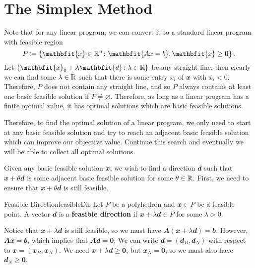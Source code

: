 \documentclass[math, code]{amznotes}
\theoremstyle{remark}
\begin{document}
\section{The Simplex Method}
Note that for any linear program, we can convert it to a standard linear program with feasible region
\begin{equation*}
    P \coloneqq \left\{\mathbfit{x} \in \R^n \colon \mathbfit{Ax = b}, \mathbfit{x} \geq \mathbf{0}\right\}.
\end{equation*}
Let $\left\{\mathbfit{x}_0 + \lambda\mathbfit{d} \colon \lambda \in \R\right\}$ be any straight line, then clearly we can find some $\lambda \in \mathbb{R}$ such that there is some entry $x_i$ of $\mathbfit{x}$ with $x_i < 0$. Therefore, $P$ does not contain any straight line, and so $P$ always contains at least one basic feasible solution if $P \neq \varnothing$. Therefore, as long as a linear program has a finite optimal value, it has optimal solutions which are basic feasible solutions.

Therefore, to find the optimal solution of a linear program, we only need to start at any basic feasible solution and try to reach an adjacent basic feasible solution which can improve our objective value. Continue this search and eventually we will be able to collect all optimal solutions.

Given any basic feasible solution $\mathbfit{x}$, we wish to find a direction $\mathbfit{d}$ such that $\mathbfit{x} + \theta\mathbfit{d}$ is some adjacent basic feasible solution for some $\theta \in \mathbb{R}$. First, we need to ensure that $\mathbfit{x} + \theta\mathbfit{d}$ is still feasible.
\begin{dfnbox}{Feasible Direction}{feasibleDir}
    Let $P$ be a polyhedron and $\mathbfit{x} \in P$ be a feasible point. A vector $\mathbfit{d}$ is a {\color{red} \textbf{feasible direction}} if $\mathbfit{x} + \lambda\mathbfit{d} \in P$ for some $\lambda > 0$.
\end{dfnbox}
Notice that $\mathbfit{x} + \lambda\mathbfit{d}$ is still feasible, so we must have $\mathbfit{A}(\mathbfit{x} + \lambda\mathbfit{d}) = \mathbfit{b}$. However, $\mathbfit{Ax} = \mathbfit{b}$, which implies that $\mathbfit{Ad} = \mathbf{0}$. We can write $\mathbfit{d} = \left(\mathbfit{d}_B, \mathbfit{d}_N\right)$ with respect to $\mathbfit{x} = \left(\mathbfit{x}_B, \mathbfit{x}_N\right)$. We need $\mathbfit{x} + \lambda\mathbfit{d} \geq \mathbf{0}$, but $\mathbfit{x}_N = \mathbf{0}$, so we must also have $\mathbfit{d}_N \geq \mathbf{0}$.
\end{document}
